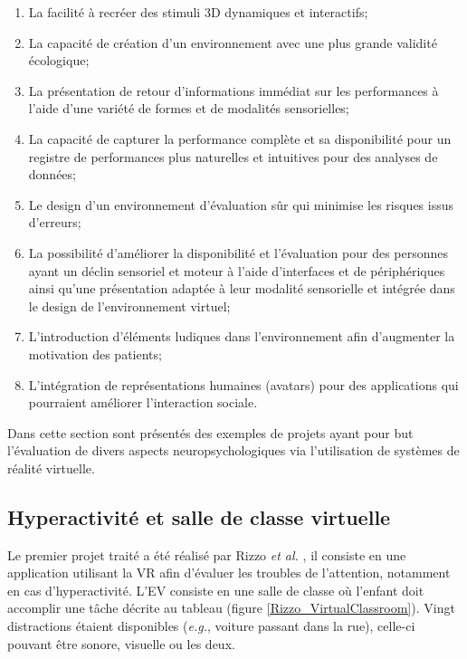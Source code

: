 	\begin{enumerate}
		\item La facilité à recréer des stimuli 3D dynamiques et interactifs;
		\item La capacité de création d'un environnement avec une plus grande validité écologique;
		\item La présentation de retour d'informations immédiat sur les performances à l'aide d'une variété de formes et de modalités sensorielles;
		\item La capacité de capturer la performance complète et sa disponibilité pour un registre de performances plus naturelles et intuitives pour des analyses de données;
		\item Le design d'un environnement d'évaluation sûr qui minimise les risques issus d'erreurs;
		\item La possibilité d'améliorer la disponibilité et l'évaluation pour des personnes ayant un déclin sensoriel et moteur à l'aide d'interfaces et de périphériques ainsi qu'une présentation adaptée à leur modalité sensorielle et intégrée dans le design de l'environnement virtuel;
		\item L'introduction d'éléments ludiques dans l'environnement afin d'augmenter la motivation des patients;
		\item L'intégration de représentations humaines (avatars) pour des applications qui pourraient améliorer l'interaction sociale.
	\end{enumerate}
	
	Dans cette section sont présentés des exemples de projets ayant pour but l'évaluation de divers aspects neuropsychologiques via l'utilisation de systèmes de réalité virtuelle.

	\subsection*{Hyperactivité et salle de classe virtuelle}
		Le premier projet traité a été réalisé par Rizzo \textit{et al.} \cite{Rizzo_Classroom}, il consiste en une application utilisant la VR afin d'évaluer les troubles de l'attention, notamment en cas d'hyperactivité. L'EV consiste en une salle de classe où l'enfant doit accomplir une tâche décrite au tableau (figure \ref{Rizzo_VirtualClassroom}). Vingt distractions étaient disponibles (\textit{e.g.}, voiture passant dans la rue), celle-ci pouvant être sonore, visuelle ou les deux.\medskip
		
